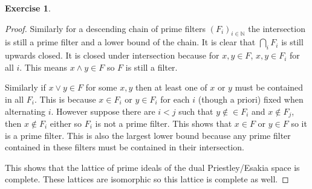 \documentclass{article}
\newcommand{\N}{\mathbb{N}}
\theoremstyle{definition}
\newtheorem{question}{Exercise}
\begin{document}
\begin{question}
\begin{enumerate}[(a)]
\begin{proof}
                  Similarly for a descending chain of prime filters
                  \((F_{i})_{i\in\N}\) the intersection is still a prime filter
                  and a lower bound of the chain. It is clear that
                  \(\bigcap_{i}F_{i}\) is still upwards closed. It is closed
                  under intersection because for \(x,y\in F\), \(x,y\in F_{i}\)
                  for all \(i\). This means \(x\wedge y\in F\) so \(F\) is still
                  a filter.

                  Similarly if \(x\vee y\in F\) for some \(x,y\) then at least
                  one of \(x\) or \(y\) must be contained in all \(F_{i}\). This
                  is because \(x\in F_{i}\) or \(y\in F_{i}\) for each \(i\)
                  (though a priori) fixed when alternating \(i\). However
                  suppose there are \(i<j\) such that \(y\notin\in F_{i}\) and
                  \(x\notin F_{j}\), then \(x\notin F_{i}\) either so \(F_{i}\)
                  is not a prime filter. This shows that \(x\in F\) or \(y\in
                  F\) so it is a prime filter. This is also the largest lower
                  bound because any prime filter contained in these filters
                  must be contained in their intersection.

                  This shows that the lattice of prime ideals of the dual
                  Priestley/Esakia space is complete. These lattices are
                  isomorphic so this lattice is complete as well.
              \end{proof}
    \end{enumerate}
\end{question}
\end{document}
